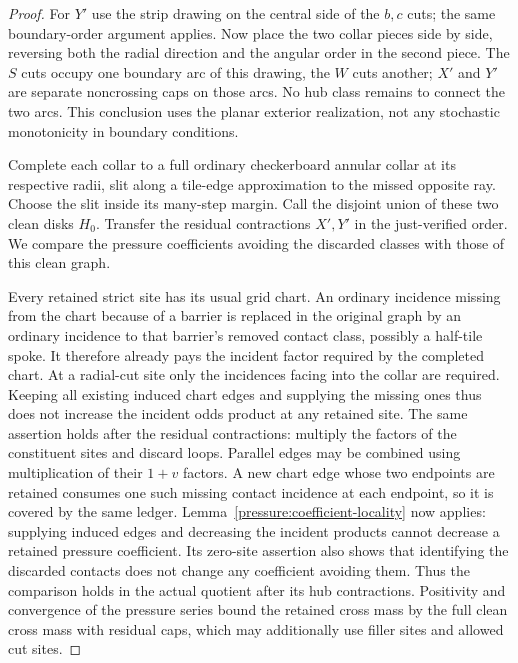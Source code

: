 \begin{proof}
For $Y'$ use the strip drawing on the central side of the $b,c$ cuts;
the same boundary-order argument applies.  Now place the two collar
pieces side by side, reversing both the radial direction and the
angular order in the second piece.  The $S$ cuts occupy one boundary
arc of this drawing, the $W$ cuts another; $X'$ and $Y'$ are separate
noncrossing caps on those arcs.  No hub class remains to connect the
two arcs.  This conclusion uses the planar exterior realization, not
any stochastic monotonicity in boundary conditions.

Complete each collar to a full ordinary checkerboard annular collar
at its respective radii, slit along a tile-edge approximation to the
missed opposite ray.  Choose the slit inside its many-step margin.
Call the disjoint union of these two clean disks $H_0$.  Transfer the
residual contractions $X',Y'$ in the just-verified order.  We compare
the pressure coefficients avoiding the discarded classes with those
of this clean graph.

Every retained strict site has its usual grid chart.  An ordinary
incidence missing from the chart because of a barrier is replaced in
the original graph by an ordinary incidence to that barrier's removed
contact class, possibly a half-tile spoke.  It therefore already pays
the incident factor required by the completed chart.  At a radial-cut
site only the incidences facing into the collar are required.  Keeping
all existing induced chart edges and supplying the missing ones thus
does not increase the incident odds product at any retained site.
The same assertion holds after the residual contractions: multiply
the factors of the constituent sites and discard loops.  Parallel
edges may be combined using multiplication of their $1+v$ factors.
A new chart edge whose two endpoints are retained consumes one such
missing contact incidence at each endpoint, so it is covered by the
same ledger.  Lemma~\ref{pressure:coefficient-locality} now applies:
supplying induced edges and decreasing the incident products cannot
decrease a retained pressure coefficient.  Its zero-site assertion
also shows that identifying the discarded contacts does not change
any coefficient avoiding them.  Thus the comparison holds in the
actual quotient after its hub contractions.  Positivity and convergence
of the pressure series bound the retained cross mass by the full clean
cross mass with residual caps, which may additionally use filler sites
and allowed cut sites.


\end{proof}
